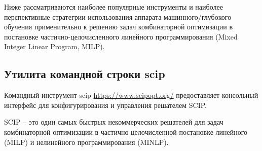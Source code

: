 \documentclass[%
	11pt,
	a4paper,
	utf8,
		]{article}
\begin{document}
Ниже рассматриваются наиболее популярные инструменты и наиболее перспективные стратегрии использования аппарата машинного/глубокого обучения применительно к решению задач комбинаторной оптимизации в постановке частично-целочисленного линейного программирования (Mixed Integer Linear Program, MILP).

\subsection{Утилита командной строки scip}

Командный инструмент scip \url{https://www.scipopt.org/} предоставляет консольный интерфейс для конфигурирования и управления решателем SCIP.

SCIP -- это один самых быстрых некоммерческих решателей для задач комбинаторной оптимизации в частично-целочисленной постановке линейного (MILP) и нелинейного программирования (MINLP).
\end{document}
